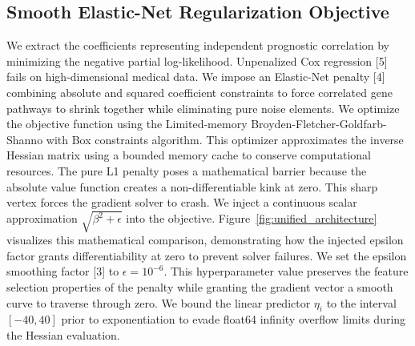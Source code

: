 \subsection{Smooth Elastic-Net Regularization Objective}
We extract the coefficients representing independent prognostic correlation by minimizing the negative partial log-likelihood. Unpenalized Cox regression [5] fails on high-dimensional medical data. We impose an Elastic-Net penalty [4] combining absolute and squared coefficient constraints to force correlated gene pathways to shrink together while eliminating pure noise elements. We optimize the objective function using the Limited-memory Broyden-Fletcher-Goldfarb-Shanno with Box constraints algorithm. This optimizer approximates the inverse Hessian matrix using a bounded memory cache to conserve computational resources. The pure L1 penalty poses a mathematical barrier because the absolute value function creates a non-differentiable kink at zero. This sharp vertex forces the gradient solver to crash. We inject a continuous scalar approximation $\sqrt{\beta^2 + \epsilon}$ into the objective. Figure~\ref{fig:unified_architecture} visualizes this mathematical comparison, demonstrating how the injected epsilon factor grants differentiability at zero to prevent solver failures. We set the epsilon smoothing factor [3] to $\epsilon = 10^{-6}$. This hyperparameter value preserves the feature selection properties of the penalty while granting the gradient vector a smooth curve to traverse through zero. We bound the linear predictor $\eta_i$ to the interval $[-40, 40]$ prior to exponentiation to evade float64 infinity overflow limits during the Hessian evaluation.


